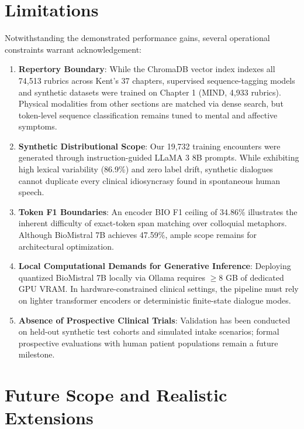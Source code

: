 
\section{Limitations}

Notwithstanding the demonstrated performance gains, several operational constraints warrant acknowledgement:

\begin{enumerate}
  \item \textbf{Repertory Boundary}: While the ChromaDB vector index indexes all 74,513 rubrics across Kent's 37 chapters, supervised sequence-tagging models and synthetic datasets were trained on Chapter 1 (MIND, 4,933 rubrics). Physical modalities from other sections are matched via dense search, but token-level sequence classification remains tuned to mental and affective symptoms.
  \item \textbf{Synthetic Distributional Scope}: Our 19,732 training encounters were generated through instruction-guided LLaMA 3 8B prompts. While exhibiting high lexical variability (86.9\%) and zero label drift, synthetic dialogues cannot duplicate every clinical idiosyncrasy found in spontaneous human speech.
  \item \textbf{Token F1 Boundaries}: An encoder BIO F1 ceiling of 34.86\% illustrates the inherent difficulty of exact-token span matching over colloquial metaphors. Although BioMistral 7B achieves 47.59\%, ample scope remains for architectural optimization.
  \item \textbf{Local Computational Demands for Generative Inference}: Deploying quantized BioMistral 7B locally via Ollama requires $\geq$8 GB of dedicated GPU VRAM. In hardware-constrained clinical settings, the pipeline must rely on lighter transformer encoders or deterministic finite-state dialogue modes.
  \item \textbf{Absence of Prospective Clinical Trials}: Validation has been conducted on held-out synthetic test cohorts and simulated intake scenarios; formal prospective evaluations with human patient populations remain a future milestone.
\end{enumerate}


\section{Future Scope and Realistic Extensions}

